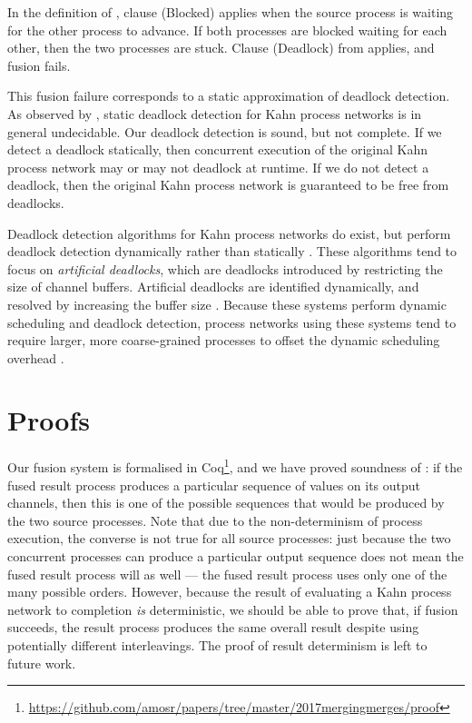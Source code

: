 In the definition of , clause (Blocked) applies when the source process is waiting for the other process to advance.
If both processes are blocked waiting for each other, then the two processes are stuck.
Clause (Deadlock) from  applies, and fusion fails.

This fusion failure corresponds to a static approximation of deadlock detection.
As observed by \citet{buck1993scheduling}, static deadlock detection for Kahn process networks is in general undecidable.
Our deadlock detection is sound, but not complete.
If we detect a deadlock statically, then concurrent execution of the original Kahn process network may or may not deadlock at runtime.
If we do not detect a deadlock, then the original Kahn process network is guaranteed to be free from deadlocks.

Deadlock detection algorithms for Kahn process networks do exist, but perform deadlock detection dynamically rather than statically \citep{allen2007distributed,jiang2008hierarchical}.
These algorithms tend to focus on \emph{artificial deadlocks}, which are deadlocks introduced by restricting the size of channel buffers.
Artificial deadlocks are identified dynamically, and resolved by increasing the buffer size \citep{geilen2003requirements,parks1995bounded}.
Because these systems perform dynamic scheduling and deadlock detection, process networks using these systems tend to require larger, more coarse-grained processes to offset the dynamic scheduling overhead \citep{chen1990impact}.


% 






\section{Proofs}
\label{s:Proofs}

Our fusion system is formalised in Coq\footnote{\url{https://github.com/amosr/papers/tree/master/2017mergingmerges/proof}}, and we have proved soundness of : if the fused result process produces a particular sequence of values on its output channels, then this is one of the possible sequences that would be produced by the two source processes.
Note that due to the non-determinism of process execution, the converse is not true for all source processes: just because the two concurrent processes can produce a particular output sequence does not mean the fused result process will as well --- the fused result process uses only one of the many possible orders.
However, because the result of evaluating a Kahn process network to completion \emph{is} deterministic, we should be able to prove that, if fusion succeeds, the result process produces the same overall result despite using potentially different interleavings.
The proof of result determinism is left to future work.

